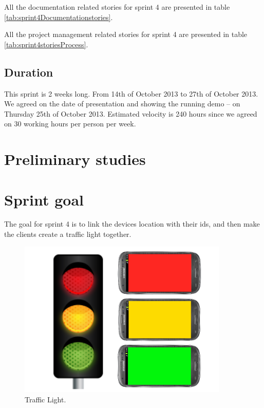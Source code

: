 All the documentation related stories for sprint 4 are presented in table \ref{tab:sprint4Documentationstories}.

All the project management related stories for sprint 4 are presented in table \ref{tab:sprint4storiesProcess}.


\subsection{Duration}
This sprint is 2 weeks long. From 14th of October 2013 to 27th of October 2013. We agreed
on the date of presentation and showing the running demo – on Thursday 25th of October 2013.
Estimated velocity is 240 hours since we agreed on 30 working hours per person per week.

\section{Preliminary studies}
\section{Sprint goal}

The goal for sprint 4 is to link the devices location with their ids, and then make the clients create a traffic light together. 
\begin{figure}[H]
	\centering
		\includegraphics[width=10cm]{sprint4/trafficlight.png}
	\caption{Traffic Light.}
	\label{fig:trafficlight }
\end{figure}

